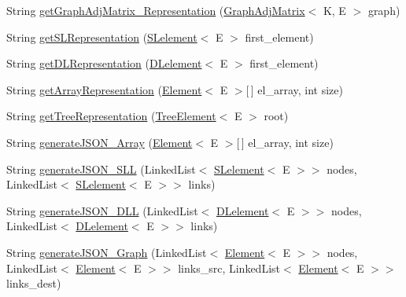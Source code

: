 \begin{DoxyCompactItemize}
\item 
String \hyperlink{classbridges_1_1base_1_1_a_d_t_visualizer_a7e3ecfc9522596bd12f0adef694eacf2}{get\+Graph\+Adj\+Matrix\+\_\+\+Representation} (\hyperlink{classbridges_1_1base_1_1_graph_adj_matrix}{Graph\+Adj\+Matrix}$<$ K, E $>$ graph)
\item 
String \hyperlink{classbridges_1_1base_1_1_a_d_t_visualizer_a8bfd44ca6eef7b19feb6061cb7e141ef}{get\+S\+L\+Representation} (\hyperlink{classbridges_1_1base_1_1_s_lelement}{S\+Lelement}$<$ E $>$ first\+\_\+element)
\item 
String \hyperlink{classbridges_1_1base_1_1_a_d_t_visualizer_a43eeb9f3321477f58edc3aff52631f3b}{get\+D\+L\+Representation} (\hyperlink{classbridges_1_1base_1_1_d_lelement}{D\+Lelement}$<$ E $>$ first\+\_\+element)
\item 
String \hyperlink{classbridges_1_1base_1_1_a_d_t_visualizer_ad44bb58d6f9c630cc6bbcae175003243}{get\+Array\+Representation} (\hyperlink{classbridges_1_1base_1_1_element}{Element}$<$ E $>$\mbox{[}$\,$\mbox{]} el\+\_\+array, int size)
\item 
String \hyperlink{classbridges_1_1base_1_1_a_d_t_visualizer_ae01d3d38d5c7c3ac239e86d6be46a50a}{get\+Tree\+Representation} (\hyperlink{classbridges_1_1base_1_1_tree_element}{Tree\+Element}$<$ E $>$ root)
\item 
String \hyperlink{classbridges_1_1base_1_1_a_d_t_visualizer_a309d4f0521b66bb1329c0362f1ca5d33}{generate\+J\+S\+O\+N\+\_\+\+Array} (\hyperlink{classbridges_1_1base_1_1_element}{Element}$<$ E $>$\mbox{[}$\,$\mbox{]} el\+\_\+array, int size)
\item 
String \hyperlink{classbridges_1_1base_1_1_a_d_t_visualizer_adf2164b7f4b3befb8b2cb2904efd8c91}{generate\+J\+S\+O\+N\+\_\+\+S\+L\+L} (Linked\+List$<$ \hyperlink{classbridges_1_1base_1_1_s_lelement}{S\+Lelement}$<$ E $>$$>$ nodes, Linked\+List$<$ \hyperlink{classbridges_1_1base_1_1_s_lelement}{S\+Lelement}$<$ E $>$$>$ links)
\item 
String \hyperlink{classbridges_1_1base_1_1_a_d_t_visualizer_a866df531965d152d5686304f07e15a4a}{generate\+J\+S\+O\+N\+\_\+\+D\+L\+L} (Linked\+List$<$ \hyperlink{classbridges_1_1base_1_1_d_lelement}{D\+Lelement}$<$ E $>$$>$ nodes, Linked\+List$<$ \hyperlink{classbridges_1_1base_1_1_d_lelement}{D\+Lelement}$<$ E $>$$>$ links)
\item 
String \hyperlink{classbridges_1_1base_1_1_a_d_t_visualizer_aabf7cbfbed0cd28b365206281176834b}{generate\+J\+S\+O\+N\+\_\+\+Graph} (Linked\+List$<$ \hyperlink{classbridges_1_1base_1_1_element}{Element}$<$ E $>$$>$ nodes, Linked\+List$<$ \hyperlink{classbridges_1_1base_1_1_element}{Element}$<$ E $>$$>$ links\+\_\+src, Linked\+List$<$ \hyperlink{classbridges_1_1base_1_1_element}{Element}$<$ E $>$$>$ links\+\_\+dest)
$$
\end{DoxyCompactItemize}
